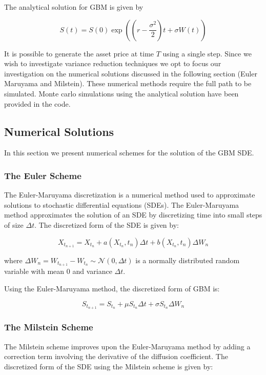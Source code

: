 \documentclass{article}
\newcommand{\para}{\vspace{8pt}} %
\begin{document}
The analytical solution for GBM is given by

\[
S(t) = S(0) \exp \left( \left( r - \frac{\sigma^2}{2} \right) t + \sigma W(t) \right)
\]

It is possible to generate the asset price at time $T$ using a single step. Since we wish to investigate variance reduction techniques 
we opt to focus our investigation on the numerical solutions discussed in the following section (Euler Maruyama and Milstein). These numerical methods
require the full path to be simulated. Monte carlo simulations using the analytical solution have been provided in the code.

\subsection{Numerical Solutions}

In this section we present numerical schemes for the solution of the GBM SDE. 

\subsubsection{The Euler Scheme}

The Euler-Maruyama discretization is a numerical method used to approximate solutions to stochastic differential equations (SDEs). The Euler-Maruyama method approximates 
the solution of an SDE by discretizing time into small steps of size $\Delta t$. The discretized form of the SDE is given by:

\[
X_{t_{n+1}} = X_{t_n} + a(X_{t_n}, t_n) \Delta t + b(X_{t_n}, t_n) \Delta W_n
\]

where $\Delta W_n = W_{t_{n+1}} - W_{t_n} \sim \mathcal{N}(0, \Delta t)$ is a normally distributed random variable with mean 0 and variance $\Delta t$.

\para
Using the Euler-Maruyama method, the discretized form of GBM is:

\[
S_{t_{n+1}} = S_{t_n} + \mu S_{t_n} \Delta t + \sigma S_{t_n} \Delta W_n
\]

\subsubsection{The Milstein Scheme}

The Milstein scheme improves upon the Euler-Maruyama method by adding a correction term involving the derivative of the diffusion coefficient. 
The discretized form of the SDE using the Milstein scheme is given by:
\end{document}
